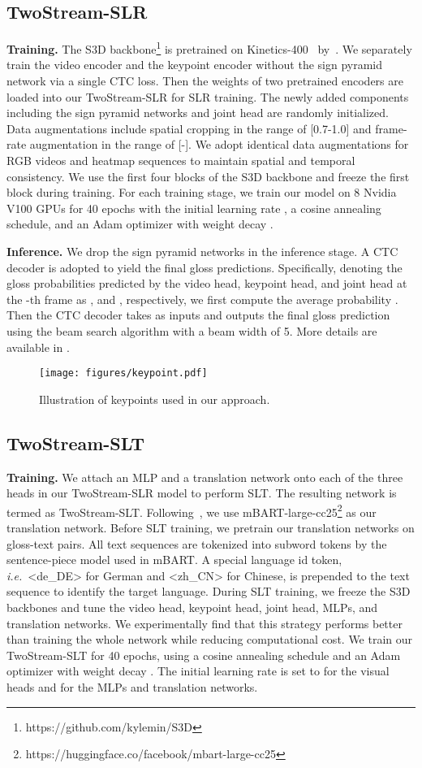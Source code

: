 \documentclass{article}
\def\ie{\emph{i.e.}} \def\Ie{\emph{I.e.}}
\begin{document}
\subsection{TwoStream-SLR}
\textbf{Training.}
The S3D backbone\footnote{https://github.com/kylemin/S3D} is pretrained on Kinetics-400~\cite{K400_dataset} by~\cite{min2019tased}. We separately train the video encoder and the keypoint encoder without the sign pyramid network via a single CTC loss. Then the weights of two pretrained encoders are loaded into our TwoStream-SLR for SLR training. The newly added components including the sign pyramid networks and joint head are randomly initialized. Data augmentations include spatial cropping in the range of [0.7-1.0] and frame-rate augmentation in the range of [-]. We adopt identical data augmentations for RGB videos and heatmap sequences to maintain spatial and temporal consistency. We use the first four blocks of the S3D backbone and freeze the first block during training. For each training stage, we train our model on 8 Nvidia V100 GPUs for 40 epochs with the initial learning rate , a cosine annealing schedule, and an Adam optimizer with weight decay .


\textbf{Inference.} We drop the sign pyramid networks in the inference stage. A CTC decoder is adopted to yield the final gloss predictions.
Specifically, denoting the gloss probabilities predicted by the video head, keypoint head, and joint head at the -th frame as , and , respectively, we first compute the average probability .
Then the CTC decoder takes  as inputs and outputs the final gloss prediction using the beam search algorithm with a beam width of 5. More details are available in \cite{graves2006connectionist}.

\begin{figure}[t]
\centering
\texttt{[image: figures/keypoint.pdf]}
\caption{Illustration of keypoints used in our approach.}
\label{fig:keypoint}
\end{figure}
\subsection{TwoStream-SLT}
\textbf{Training.} We attach an MLP and a translation network onto each of the three heads in our TwoStream-SLR model to perform SLT. The resulting network is termed as TwoStream-SLT. Following~\cite{MMTLB_2022}, we use mBART-large-cc25\footnote{https://huggingface.co/facebook/mbart-large-cc25} as our translation network. Before SLT training, we pretrain our translation networks on gloss-text pairs. All text sequences are tokenized into subword tokens by the sentence-piece model used in mBART. A special language id token, \ie~<de\_DE> for German and <zh\_CN> for Chinese, is prepended to the text sequence to identify the target language. During SLT training, we freeze the S3D backbones and tune the video head, keypoint head, joint head, MLPs, and translation networks. We experimentally find that this strategy performs better than training the whole network while reducing computational cost. We train our TwoStream-SLT for 40 epochs, using a cosine annealing schedule and an Adam optimizer with weight decay . The initial learning rate is set to  for the visual heads and  for the MLPs and translation networks. 
\end{document}
